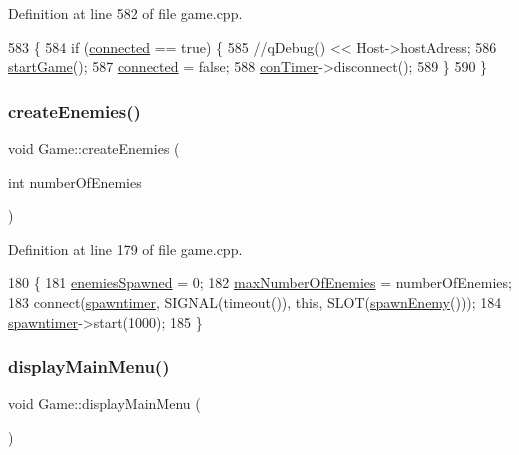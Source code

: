 Definition at line 582 of file game.\+cpp.


\begin{DoxyCode}
583 \{  
584     \textcolor{keywordflow}{if} (\hyperlink{class_game_aec6408b42da34f430bffb649653de96b}{connected} == \textcolor{keyword}{true}) \{
585         \textcolor{comment}{//qDebug() << Host->hostAdress;}
586         \hyperlink{class_game_ae8638ccdb0ef3bf39a6affa30aa1258f}{startGame}();
587         \hyperlink{class_game_aec6408b42da34f430bffb649653de96b}{connected} = \textcolor{keyword}{false};
588         \hyperlink{class_game_a266d51c575b09c22aac86e20487802f4}{conTimer}->disconnect();
589     \}
590 \}
\end{DoxyCode}
\mbox{\label{class_game_a622303239641db82911ea67bde3ba1a0}} 
\subsubsection{\texorpdfstring{create\+Enemies()}{createEnemies()}}
{\footnotesize\ttfamily void Game\+::create\+Enemies (\begin{DoxyParamCaption}\item[{int}]{number\+Of\+Enemies }\end{DoxyParamCaption})}



Definition at line 179 of file game.\+cpp.


\begin{DoxyCode}
180 \{
181     \hyperlink{class_game_a6ac18c388eda83ceb3212e099b3b8473}{enemiesSpawned} = 0;
182     \hyperlink{class_game_aaee1756450bae685777ee86c45ef4f78}{maxNumberOfEnemies} = numberOfEnemies;
183     connect(\hyperlink{class_game_a4a8895723160ca3585fe140e476aea1f}{spawntimer}, SIGNAL(timeout()), \textcolor{keyword}{this}, SLOT(\hyperlink{class_game_ad7a4181414089729ddea00c053f822c4}{spawnEnemy}()));
184     \hyperlink{class_game_a4a8895723160ca3585fe140e476aea1f}{spawntimer}->start(1000);
185 \}
\end{DoxyCode}
\mbox{\label{class_game_af74fd203e3b31917ca9d4769fa608c48}} 
\subsubsection{\texorpdfstring{display\+Main\+Menu()}{displayMainMenu()}}
{\footnotesize\ttfamily void Game\+::display\+Main\+Menu (\begin{DoxyParamCaption}{ }\end{DoxyParamCaption})}



